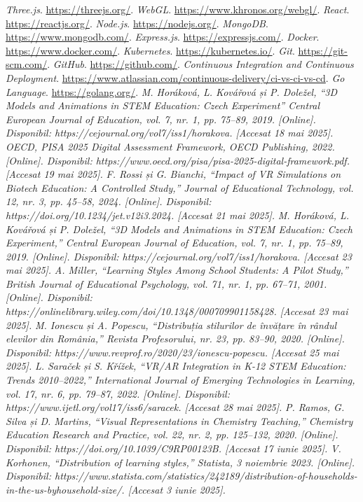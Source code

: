 \documentclass{thesis.cs.pub.ro}
\begin{document}
\begin{thebibliography}{9}
\textit{Three.js}. \url{https://threejs.org/}.
\textit{WebGL}. \url{https://www.khronos.org/webgl/}.
\textit{React}. \url{https://reactjs.org/}.
\textit{Node.js}. \url{https://nodejs.org/}.
\textit{MongoDB}. \url{https://www.mongodb.com/}.
\textit{Express.js}. \url{https://expressjs.com/}.
\textit{Docker}. \url{https://www.docker.com/}.
\textit{Kubernetes}. \url{https://kubernetes.io/}.
\textit{Git}. \url{https://git-scm.com/}.
\textit{GitHub}. \url{https://github.com/}.
\textit{Continuous Integration and Continuous Deployment}. \url{https://www.atlassian.com/continuous-delivery/ci-vs-ci-vs-cd}.
\textit{Go Language}. \url{https://golang.org/}.
\textit{M. Horáková, L. Kovářová și P. Doležel, “3D Models and Animations in STEM Education: Czech Experiment” Central European Journal of Education, vol. 7, nr. 1, pp. 75–89, 2019. [Online].
Disponibil: https://cejournal.org/vol7/iss1/horakova. [Accesat 18 mai 2025].}
\textit{OECD, PISA 2025 Digital Assessment Framework, OECD Publishing, 2022. [Online]. Disponibil: https://www.oecd.org/pisa/pisa-2025-digital-framework.pdf. [Accesat 19 mai 2025].}
\textit{F. Rossi și G. Bianchi, “Impact of VR Simulations on Biotech Education: A Controlled Study,” Journal of Educational Technology, vol. 12, nr. 3, pp. 45–58, 2024. [Online]. Disponibil: https://doi.org/10.1234/jet.v12i3.2024. [Accesat 21 mai 2025].}
\textit{M. Horáková, L. Kovářová și P. Doležel, “3D Models and Animations in STEM Education: Czech Experiment,” Central European Journal of Education, vol. 7, nr. 1, pp. 75–89, 2019. [Online]. Disponibil: https://cejournal.org/vol7/iss1/horakova. [Accesat 23 mai 2025].}
\textit{A. Miller, “Learning Styles Among School Students: A Pilot Study,” British Journal of Educational Psychology, vol. 71, nr. 1, pp. 67–71, 2001. [Online]. Disponibil: https://onlinelibrary.wiley.com/doi/10.1348/000709901158428. [Accesat 23 mai 2025].}
\textit{M. Ionescu și A. Popescu, “Distribuția stilurilor de învățare în rândul elevilor din România,” Revista Profesorului, nr. 23, pp. 83–90, 2020. [Online]. Disponibil: https://www.revprof.ro/2020/23/ionescu-popescu. [Accesat 25 mai 2025].}
\textit{L. Saraček și S. Křížek, “VR/AR Integration in K-12 STEM Education: Trends 2010–2022,” International Journal of Emerging Technologies in Learning, vol. 17, nr. 6, pp. 79–87, 2022. [Online]. Disponibil: https://www.ijetl.org/vol17/iss6/saracek. [Accesat 28 mai 2025].}
\textit{P. Ramos, G. Silva și D. Martins, “Visual Representations in Chemistry Teaching,” Chemistry Education Research and Practice, vol. 22, nr. 2, pp. 125–132, 2020. [Online]. Disponibil: https://doi.org/10.1039/C9RP00123B. [Accesat 17 iunie 2025].}
\textit{V. Korhonen, “Distribution of learning styles,” Statista, 3 noiembrie 2023. [Online]. Disponibil: https://www.statista.com/statistics/242189/distribution-of-households-in-the-us-byhousehold-size/. [Accesat 3 iunie 2025].}

\end{thebibliography}

\printindex
\end{document}
